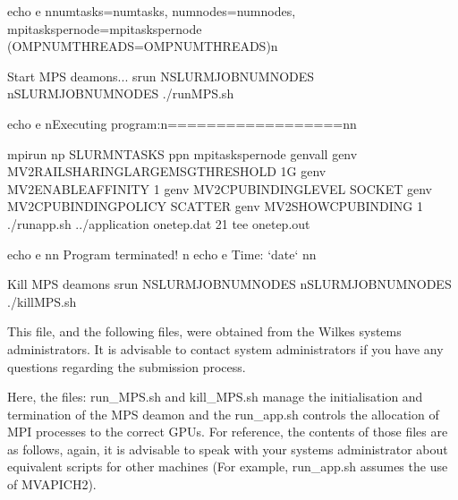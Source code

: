 \documentclass[letterpaper,10pt,english]{sphinxmanual}
\begin{document}
\begin{sphinxVerbatim}[commandchars=\\\{\}]
echo \PYGZhy{}e \PYGZdq{}\PYGZbs{}nnumtasks=\PYGZdl{}numtasks, numnodes=\PYGZdl{}numnodes, \PYGZbs{}
mpi\PYGZus{}tasks\PYGZus{}per\PYGZus{}node=\PYGZdl{}mpi\PYGZus{}tasks\PYGZus{}per\PYGZus{}node (OMP\PYGZus{}NUM\PYGZus{}THREADS=\PYGZdl{}OMP\PYGZus{}NUM\PYGZus{}THREADS)\PYGZbs{}n\PYGZdq{}

\PYGZsh{} Start MPS deamons...
srun \PYGZhy{}N\PYGZdl{}SLURM\PYGZus{}JOB\PYGZus{}NUM\PYGZus{}NODES \PYGZhy{}n\PYGZdl{}SLURM\PYGZus{}JOB\PYGZus{}NUM\PYGZus{}NODES ./run\PYGZus{}MPS.sh

echo \PYGZhy{}e \PYGZdq{}\PYGZbs{}nExecuting program:\PYGZbs{}n==================\PYGZbs{}n\PYGZbs{}n\PYGZdq{}

mpirun \PYGZhy{}np \PYGZdl{}\PYGZob{}SLURM\PYGZus{}NTASKS\PYGZcb{} \PYGZhy{}ppn \PYGZdl{}\PYGZob{}mpi\PYGZus{}tasks\PYGZus{}per\PYGZus{}node\PYGZcb{} \PYGZhy{}\PYGZhy{}genvall \PYGZbs{}
\PYGZhy{}genv MV2\PYGZus{}RAIL\PYGZus{}SHARING\PYGZus{}LARGE\PYGZus{}MSG\PYGZus{}THRESHOLD 1G \PYGZhy{}genv MV2\PYGZus{}ENABLE\PYGZus{}AFFINITY 1 \PYGZbs{}
\PYGZhy{}genv MV2\PYGZus{}CPU\PYGZus{}BINDING\PYGZus{}LEVEL SOCKET \PYGZhy{}genv MV2\PYGZus{}CPU\PYGZus{}BINDING\PYGZus{}POLICY SCATTER \PYGZbs{}
\PYGZhy{}genv MV2\PYGZus{}SHOW\PYGZus{}CPU\PYGZus{}BINDING 1 ./run\PYGZus{}app.sh ../\PYGZdl{}\PYGZob{}application\PYGZcb{} onetep.dat 2\PYGZgt{}\PYGZam{}1 \PYGZbs{}
\textbar{} tee onetep.out


echo \PYGZhy{}e \PYGZdq{}\PYGZbs{}n\PYGZbs{}n\PYGZgt{}\PYGZgt{}\PYGZgt{} Program terminated! \PYGZlt{}\PYGZlt{}\PYGZlt{}\PYGZbs{}n\PYGZdq{}
echo \PYGZhy{}e \PYGZdq{}Time: {}`date{}` \PYGZbs{}n\PYGZbs{}n\PYGZdq{}

\PYGZsh{} Kill MPS deamons
srun \PYGZhy{}N\PYGZdl{}SLURM\PYGZus{}JOB\PYGZus{}NUM\PYGZus{}NODES \PYGZhy{}n\PYGZdl{}SLURM\PYGZus{}JOB\PYGZus{}NUM\PYGZus{}NODES ./kill\PYGZus{}MPS.sh
\end{sphinxVerbatim}

This file, and the following files, were obtained from the Wilkes
systems administrators. It is advisable to contact system administrators
if you have any questions regarding the submission process.

Here, the files: run\_MPS.sh and kill\_MPS.sh manage the initialisation
and termination of the MPS deamon and the run\_app.sh controls the
allocation of MPI processes to the correct GPUs. For reference, the
contents of those files are as follows, again, it is advisable to speak
with your systems administrator about equivalent scripts for other
machines (For example, run\_app.sh assumes the use of MVAPICH2).
\end{document}
